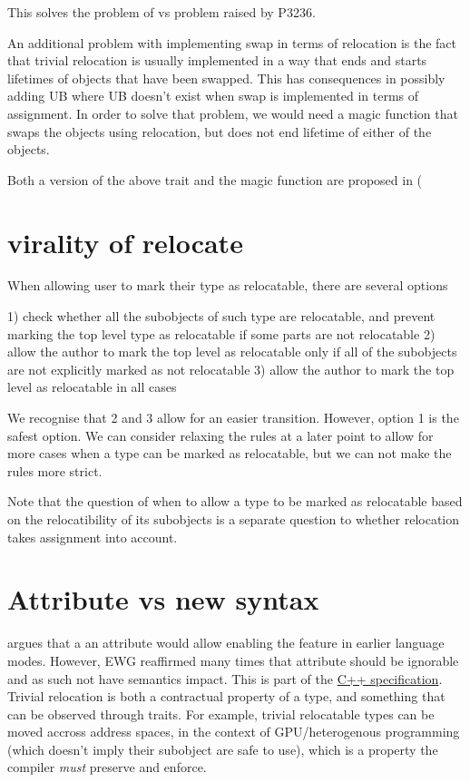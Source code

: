 \documentclass{wg21}
\begin{document}
This solves the problem of  vs  problem raised by P3236.

An additional problem with implementing swap in terms of relocation is the fact that trivial relocation is usually implemented in a way that ends and starts lifetimes of objects that have been swapped. This has consequences in possibly adding UB where UB doesn't exist when swap is implemented in terms of assignment. In order to solve that problem, we would need a magic function that swaps the objects using relocation, but does not end lifetime of either of the objects.

Both a version of the above trait and the magic function are proposed in (%


\section{virality of relocate}

When allowing user to mark their type as relocatable, there are several options

1) check whether all the subobjects of such type are relocatable, and prevent marking the top level type as relocatable if some parts are not relocatable
2) allow the author to mark the top level as relocatable only if all of the subobjects are not explicitly marked as not relocatable
3) allow the author to mark the top level as relocatable in all cases

We recognise that 2 and 3 allow for an easier transition. However, option 1 is the safest option. We can consider relaxing the rules at a later point to allow for more cases when a type can be marked as relocatable, but we can not make the rules more strict.

Note that the question of when to allow a type to be marked as relocatable based on the relocatibility of its subobjects is a separate question to whether relocation takes assignment into account.

\section{Attribute vs new syntax}

 argues that a an attribute would allow enabling the feature in earlier language modes.
However, EWG reaffirmed many times that attribute should be ignorable and as such not have semantics impact.
This is part of the \href{https://eel.is/c++draft/dcl.attr#grammar-note-5}{C++ specification}.
Trivial relocation is both a contractual property of a type, and something that can be observed through traits.
For example, trivial relocatable types can be moved accross address spaces, in the context of GPU/heterogenous programming
(which doesn't imply their subobject are safe to use), which is a property the compiler \emph{must} preserve and enforce.
\end{document}
